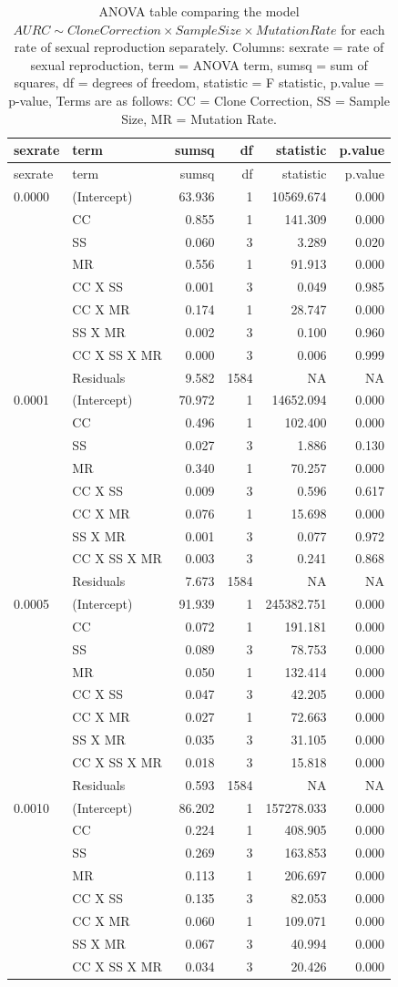 \documentclass[]{article}
\theoremstyle{definition}
\theoremstyle{definition}
\theoremstyle{remark}
\begin{document}
\begin{longtable}[]{@{}llrrrr@{}}
\caption{\label{tab:sim3} ANOVA table comparing the model
\(AURC \sim Clone Correction \times Sample Size \times Mutation Rate\)
for each rate of sexual reproduction separately. Columns: sexrate = rate
of sexual reproduction, term = ANOVA term, sumsq = sum of squares, df =
degrees of freedom, statistic = F statistic, p.value = p-value, Terms
are as follows: CC = Clone Correction, SS = Sample Size, MR = Mutation
Rate.}\tabularnewline
\toprule
sexrate & term & sumsq & df & statistic & p.value\tabularnewline
\midrule
\endfirsthead
\toprule
sexrate & term & sumsq & df & statistic & p.value\tabularnewline
\midrule
\endhead
0.0000 & (Intercept) & 63.936 & 1 & 10569.674 & 0.000\tabularnewline
& CC & 0.855 & 1 & 141.309 & 0.000\tabularnewline
& SS & 0.060 & 3 & 3.289 & 0.020\tabularnewline
& MR & 0.556 & 1 & 91.913 & 0.000\tabularnewline
& CC X SS & 0.001 & 3 & 0.049 & 0.985\tabularnewline
& CC X MR & 0.174 & 1 & 28.747 & 0.000\tabularnewline
& SS X MR & 0.002 & 3 & 0.100 & 0.960\tabularnewline
& CC X SS X MR & 0.000 & 3 & 0.006 & 0.999\tabularnewline
& Residuals & 9.582 & 1584 & NA & NA\tabularnewline
0.0001 & (Intercept) & 70.972 & 1 & 14652.094 & 0.000\tabularnewline
& CC & 0.496 & 1 & 102.400 & 0.000\tabularnewline
& SS & 0.027 & 3 & 1.886 & 0.130\tabularnewline
& MR & 0.340 & 1 & 70.257 & 0.000\tabularnewline
& CC X SS & 0.009 & 3 & 0.596 & 0.617\tabularnewline
& CC X MR & 0.076 & 1 & 15.698 & 0.000\tabularnewline
& SS X MR & 0.001 & 3 & 0.077 & 0.972\tabularnewline
& CC X SS X MR & 0.003 & 3 & 0.241 & 0.868\tabularnewline
& Residuals & 7.673 & 1584 & NA & NA\tabularnewline
0.0005 & (Intercept) & 91.939 & 1 & 245382.751 & 0.000\tabularnewline
& CC & 0.072 & 1 & 191.181 & 0.000\tabularnewline
& SS & 0.089 & 3 & 78.753 & 0.000\tabularnewline
& MR & 0.050 & 1 & 132.414 & 0.000\tabularnewline
& CC X SS & 0.047 & 3 & 42.205 & 0.000\tabularnewline
& CC X MR & 0.027 & 1 & 72.663 & 0.000\tabularnewline
& SS X MR & 0.035 & 3 & 31.105 & 0.000\tabularnewline
& CC X SS X MR & 0.018 & 3 & 15.818 & 0.000\tabularnewline
& Residuals & 0.593 & 1584 & NA & NA\tabularnewline
0.0010 & (Intercept) & 86.202 & 1 & 157278.033 & 0.000\tabularnewline
& CC & 0.224 & 1 & 408.905 & 0.000\tabularnewline
& SS & 0.269 & 3 & 163.853 & 0.000\tabularnewline
& MR & 0.113 & 1 & 206.697 & 0.000\tabularnewline
& CC X SS & 0.135 & 3 & 82.053 & 0.000\tabularnewline
& CC X MR & 0.060 & 1 & 109.071 & 0.000\tabularnewline
& SS X MR & 0.067 & 3 & 40.994 & 0.000\tabularnewline
& CC X SS X MR & 0.034 & 3 & 20.426 & 0.000\tabularnewline

\end{longtable}
\end{document}
